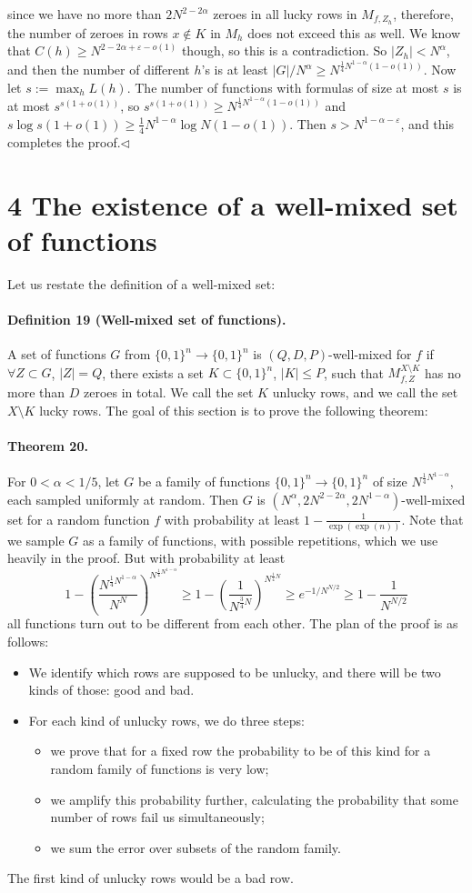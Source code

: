 since we have no more than $2N^{2-2\alpha}$ zeroes in all lucky rows in $M_{f,Z_h}$, therefore, the number of zeroes in rows $x\notin K$ in $M_h$ does not exceed this as well. We know that $C(h)\geq N^{2-2\alpha+\varepsilon-o(1)}$ though, so this is a contradiction.
So $|Z_h|<N^\alpha$, and then the number of different $h$'s is at least $|G|/N^\alpha\geq N^{\frac14N^{1-\alpha}(1-o(1))}$.
Now let $s:=\max_hL(h)$. The number of functions with formulas of size at most $s$ is at most $s^{s(1+o(1))}$, so $s^{s(1+o(1))}\geq N^{\frac14N^{1-\alpha}(1-o(1))}$ and $s\log s(1+o(1))\geq\frac14N^{1-\alpha}\log N(1-o(1))$. Then $s>N^{1-\alpha-\varepsilon}$, and this completes the proof.\hfill$\triangleleft$
\section*{4 The existence of a well-mixed set of functions}
Let us restate the definition of a well-mixed set:
\paragraph{Definition 19 (Well-mixed set of functions).} A set of functions $G$ from $\{0,1\}^n\to\{0,1\}^n$ is $(Q,D,P)$-well-mixed for $f$ if $\forall Z\subset G$, $|Z|=Q$, there exists a set $K\subset\{0,1\}^n$, $|K|\leq P$, such that $M_{f,Z}^{X\setminus K}$ has no more than $D$ zeroes in total. We call the set $K$ unlucky rows, and we call the set $X\setminus K$ lucky rows.
The goal of this section is to prove the following theorem:
\paragraph{Theorem 20.} For $0<\alpha<1/5$, let $G$ be a family of functions $\{0,1\}^n\to\{0,1\}^n$ of size $N^{\frac14N^{1-\alpha}}$, each sampled uniformly at random. Then $G$ is $(N^\alpha,2N^{2-2\alpha},2N^{1-\alpha})$-well-mixed set for a random function $f$ with probability at least $1-\frac1{\exp(\exp(n))}$.
Note that we sample $G$ as a family of functions, with possible repetitions, which we use heavily in the proof. But with probability at least
\[1-\left(\frac{N^{\frac14N^{1-\alpha}}}{N^N}\right)^{N^{\frac14N^{1-\alpha}}}\geq1-\left(\frac1{N^{\frac34N}}\right)^{N^{\frac14N}}\geq e^{-1/N^{N/2}}\geq1-\frac1{N^{N/2}}\]
all functions turn out to be different from each other.
The plan of the proof is as follows:
\begin{itemize}
\item We identify which rows are supposed to be unlucky, and there will be two kinds of those: good and bad.
\item For each kind of unlucky rows, we do three steps:
\begin{itemize}
\item we prove that for a fixed row the probability to be of this kind for a random family of functions is very low;
\item we amplify this probability further, calculating the probability that some number of rows fail us simultaneously;
\item we sum the error over subsets of the random family.
\end{itemize}
\end{itemize}
The first kind of unlucky rows would be a bad row.
